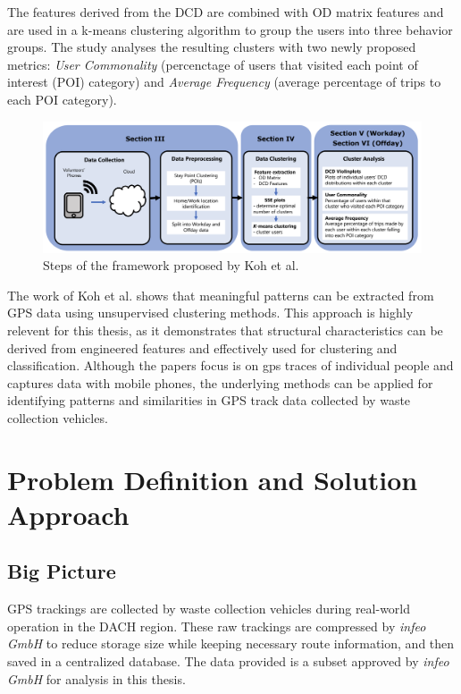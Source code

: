 \documentclass[a4paper,12pt,twoside]{scrreprt}
\begin{document}
The features derived from the DCD are combined with OD matrix
features
and are used in a k-means clustering algorithm to group the users into three
behavior groups. The study analyses the resulting clusters with two newly
proposed
metrics: \textit{User Commonality} (percenctage of users that visited each
point of interest (POI) category) and \textit{Average Frequency} (average
percentage of trips to each POI category).~\cite{koh_clustering_2022}

\begin{figure}[htbp]
  \centering

  \includegraphics[width=\textwidth]{Figures/related_work/koh_clustering_framwork_flowchart.png}
  \caption{Steps of the framework proposed by Koh et
    al.~\cite{koh_clustering_2022}}
  \label{fig:koh_clustering_framework}
\end{figure}
\FloatBarrier

The work of Koh et al. shows that meaningful patterns can be extracted from GPS
data using unsupervised clustering methods. This approach is highly relevent
for this thesis,
as it demonstrates that structural characteristics can be derived from
engineered features
and effectively used for clustering and classification. Although the papers
focus is on
gps traces of individual people and captures data with mobile phones, the
underlying methods can
be applied for identifying patterns and similarities in GPS track data
collected by
waste collection vehicles.

\chapter{Problem Definition and Solution Approach}

\section{Big Picture}

GPS trackings are collected by waste collection vehicles during real-world
operation in the DACH region.
These raw trackings are compressed by \textit{infeo GmbH} to reduce storage
size while
keeping necessary route information, and then saved in a centralized database.
The data provided is a subset approved by \textit{infeo GmbH} for analysis in
this thesis.
\end{document}
